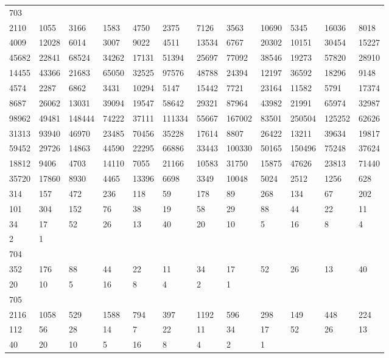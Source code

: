 \begin{longtable}{llllllllllll}
703&&&&&&&&&&&\\
2110& 1055& 3166& 1583& 4750& 2375& 7126& 3563& 10690& 5345& 16036& 8018\\
4009& 12028& 6014& 3007& 9022& 4511& 13534& 6767& 20302& 10151& 30454& 15227\\
45682& 22841& 68524& 34262& 17131& 51394& 25697& 77092& 38546& 19273& 57820& 28910\\
14455& 43366& 21683& 65050& 32525& 97576& 48788& 24394& 12197& 36592& 18296& 9148\\
4574& 2287& 6862& 3431& 10294& 5147& 15442& 7721& 23164& 11582& 5791& 17374\\
8687& 26062& 13031& 39094& 19547& 58642& 29321& 87964& 43982& 21991& 65974& 32987\\
98962& 49481& 148444& 74222& 37111& 111334& 55667& 167002& 83501& 250504& 125252& 62626\\
31313& 93940& 46970& 23485& 70456& 35228& 17614& 8807& 26422& 13211& 39634& 19817\\
59452& 29726& 14863& 44590& 22295& 66886& 33443& 100330& 50165& 150496& 75248& 37624\\
18812& 9406& 4703& 14110& 7055& 21166& 10583& 31750& 15875& 47626& 23813& 71440\\
35720& 17860& 8930& 4465& 13396& 6698& 3349& 10048& 5024& 2512& 1256& 628\\
314& 157& 472& 236& 118& 59& 178& 89& 268& 134& 67& 202\\
101& 304& 152& 76& 38& 19& 58& 29& 88& 44& 22& 11\\
34& 17& 52& 26& 13& 40& 20& 10& 5& 16& 8& 4\\
2& 1& \\

704&&&&&&&&&&&\\
352& 176& 88& 44& 22& 11& 34& 17& 52& 26& 13& 40\\
20& 10& 5& 16& 8& 4& 2& 1& \\

705&&&&&&&&&&&\\
2116& 1058& 529& 1588& 794& 397& 1192& 596& 298& 149& 448& 224\\
112& 56& 28& 14& 7& 22& 11& 34& 17& 52& 26& 13\\
40& 20& 10& 5& 16& 8& 4& 2& 1& \\


\end{longtable}
